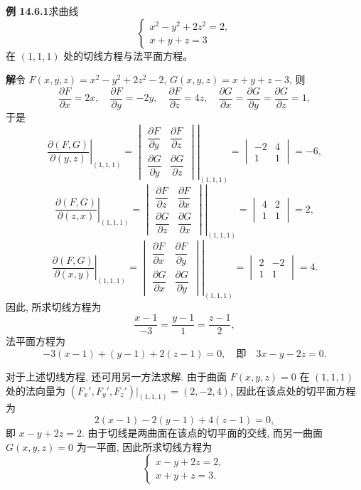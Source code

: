 \documentclass[UTF8,12pt,a4paper,fontset=fandol]{ctexart}
\begin{document}
\noindent\textbf{例 14.6.1}\quad 求曲线
\[
  \begin{cases}
    x^2-y^2+2z^2=2,\\
    x+y+z=3
  \end{cases}
\]
在 $(1,1,1)$ 处的切线方程与法平面方程。

\noindent\textbf{解}\quad 令 $F(x,y,z)=x^2-y^2+2z^2-2$, $G(x,y,z)=x+y+z-3$, 则
\[
  \frac{\partial F}{\partial x}=2x,\quad
  \frac{\partial F}{\partial y}=-2y,\quad
  \frac{\partial F}{\partial z}=4z,\quad
  \frac{\partial G}{\partial x}
  =
  \frac{\partial G}{\partial y}
  =
  \frac{\partial G}{\partial z}
  =1,
\]
于是
\[
  \left.\frac{\partial(F,G)}{\partial(y,z)}\right|_{(1,1,1)}
  =
  \left.
  \begin{vmatrix}
    \dfrac{\partial F}{\partial y} & \dfrac{\partial F}{\partial z}\\
    \dfrac{\partial G}{\partial y} & \dfrac{\partial G}{\partial z}
  \end{vmatrix}
  \right|_{(1,1,1)}
  =
  \begin{vmatrix}
    -2 & 4\\
    1 & 1
  \end{vmatrix}
  =-6,
\]
\[
  \left.\frac{\partial(F,G)}{\partial(z,x)}\right|_{(1,1,1)}
  =
  \left.
  \begin{vmatrix}
    \dfrac{\partial F}{\partial z} & \dfrac{\partial F}{\partial x}\\
    \dfrac{\partial G}{\partial z} & \dfrac{\partial G}{\partial x}
  \end{vmatrix}
  \right|_{(1,1,1)}
  =
  \begin{vmatrix}
    4 & 2\\
    1 & 1
  \end{vmatrix}
  =2,
\]
\[
  \left.\frac{\partial(F,G)}{\partial(x,y)}\right|_{(1,1,1)}
  =
  \left.
  \begin{vmatrix}
    \dfrac{\partial F}{\partial x} & \dfrac{\partial F}{\partial y}\\
    \dfrac{\partial G}{\partial x} & \dfrac{\partial G}{\partial y}
  \end{vmatrix}
  \right|_{(1,1,1)}
  =
  \begin{vmatrix}
    2 & -2\\
    1 & 1
  \end{vmatrix}
  =4.
\]
因此, 所求切线方程为
\[
  \frac{x-1}{-3}=\frac{y-1}{1}=\frac{z-1}{2},
\]
法平面方程为
\[
  -3(x-1)+(y-1)+2(z-1)=0,\quad \text{即}\quad 3x-y-2z=0.
\]

对于上述切线方程, 还可用另一方法求解. 由于曲面 $F(x,y,z)=0$ 在 $(1,1,1)$ 处的法向量为 $(F_x',F_y',F_z')|_{(1,1,1)}=(2,-2,4)$, 因此在该点处的切平面方程为
\[
  2(x-1)-2(y-1)+4(z-1)=0,
\]
即 $x-y+2z=2$. 由于切线是两曲面在该点的切平面的交线, 而另一曲面 $G(x,y,z)=0$ 为一平面, 因此所求切线方程为
\[
  \begin{cases}
    x-y+2z=2,\\
    x+y+z=3.
  \end{cases}
\]
\end{document}
